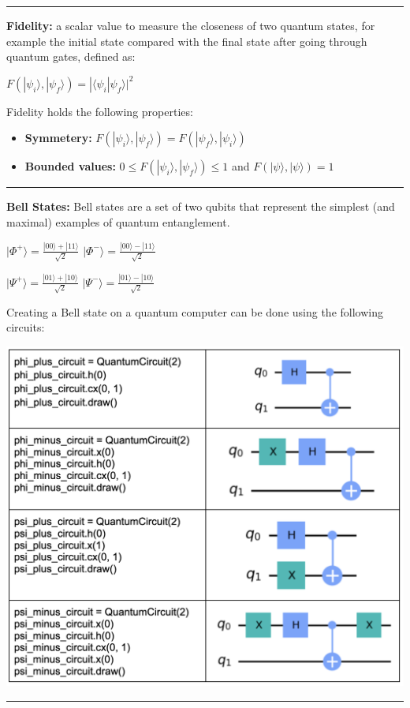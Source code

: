 \documentclass{article}
\begin{document}
 
\vspace{5pt}
\hrule 
\vspace{5pt}


\textbf{Fidelity:} a scalar value to measure the closeness of two quantum states, for example the initial state compared with the final state after going through quantum gates, defined as:

\begin{center}

$ F(|\psi_{i}\rangle, |\psi_{f}\rangle) = | \langle \psi_{i} | \psi_{f}\rangle | ^2 $ 

\end{center}

Fidelity holds the following properties:

\begin{itemize}
	\item \textbf{Symmetery:}  $ F(|\psi_{i}\rangle, |\psi_{f}\rangle) = F( |\psi_{f}\rangle, |\psi_{i}\rangle ) $
	\item \textbf{Bounded values:}  $ 0 \le F(|\psi_{i}\rangle, |\psi_{f}\rangle) \le 1$ and $ F(|\psi\rangle,|\psi\rangle) = 1 $
\end{itemize}

\vspace{5pt}
\hrule 
\vspace{5pt}


\newpage

\textbf{Bell States:}
Bell states are a set of two qubits that represent the simplest (and maximal) examples of quantum entanglement.
\begin{center}
$|\Phi^+\rangle = \frac{|00\rangle + |11\rangle}{\sqrt{2}}$
\quad
$|\Phi^-\rangle = \frac{|00\rangle - |11\rangle}{\sqrt{2}}$

\quad

$|\Psi^+\rangle = \frac{|01\rangle + |10\rangle}{\sqrt{2}}$
\quad
$|\Psi^-\rangle = \frac{|01\rangle - |10\rangle}{\sqrt{2}}$

\end{center}

Creating a Bell state on a quantum computer can be done using the following circuits:

\includegraphics[width=1\textwidth]{bell_states}



\vspace{5pt}

\hrule
\vspace{5pt}
\end{document}
